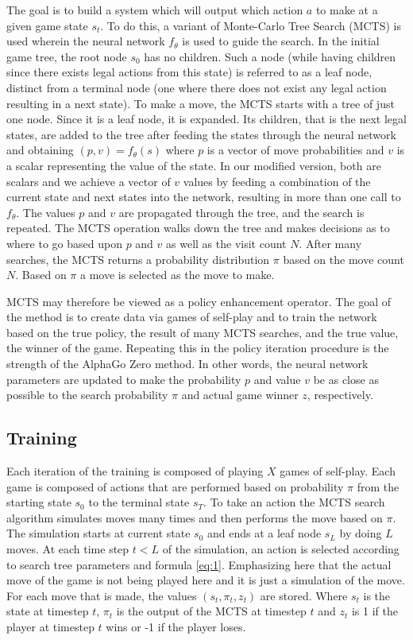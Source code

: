 \documentclass[english]{article}
\begin{document}
The goal is to build a system which will output which action $a$ to make at a
given game state $s_t$. To do this, a variant of Monte-Carlo Tree Search (MCTS)
is used wherein the neural
network $f_{\theta}$ is used to guide the search. In the initial
game tree, the root node $s_0$ has no children. Such a node (while having
children since there exists legal actions from this state) is referred to as a
leaf node, distinct from a terminal node (one where there does not exist any
legal action resulting in a next state). To make a move, the MCTS starts with a
tree of just one node. Since it is a leaf node, it is expanded. Its children,
that is the next legal states, are added to the tree after feeding the states
through the neural network and obtaining $(p, v) = f_{\theta}(s)$ where $p$ is a
vector of move probabilities and $v$ is a scalar representing the value of the
state. In our modified version, both are scalars and we achieve a vector of $v$
values by feeding a combination of the current state and next states into the
network, resulting in more than one call to $f_{\theta}$. The values $p$ and $v$
are propagated through the tree, and the search is repeated. The MCTS operation
walks down the tree and makes decisions as to where to go based upon $p$ and $v$
as well as the visit count $N$. After many searches, the MCTS returns a
probability distribution $\pi$ based on the move count $N$. Based on $\pi$ a
move is selected as the move to make.

MCTS may therefore be viewed as a policy enhancement operator. The goal of the
method is to create data via games of self-play and to train the network based
on the true policy, the result of many MCTS searches, and the true value, the
winner of the game. Repeating this in the policy
iteration procedure is the strength of the AlphaGo Zero method. In
other words, the neural network parameters are updated to make the
probability $p$ and value $v$ be as close as possible to the search
probability $\pi$ and actual game winner $z$, respectively.

\subsection{Training}
Each iteration of the training is composed of playing $X$ games of self-play. Each game is composed of actions that are
performed based on probability $\pi$ from the starting state $s_{0}$
to the terminal state $s_{T}$. To take an action the MCTS search
algorithm simulates moves many times and then performs the move
based on $\pi$. The simulation starts at current state $s_0$ and ends
at a leaf node $s_{L}$ by doing $L$ moves. At each time step $t<L$
of the simulation, an action is selected according to search tree
parameters and formula \ref{eq:1}. Emphasizing here that the actual
move of the game is not being played here and it is just a simulation
of the move. For each move that is made, the values $(s_t, \pi_t, z_t)$ are stored.
Where $s_t$ is the state at timestep $t$, $\pi_t$ is the output of the MCTS at
timestep $t$ and $z_t$ is 1 if the player at timestep $t$ wins or -1 if the
player loses.
\end{document}
